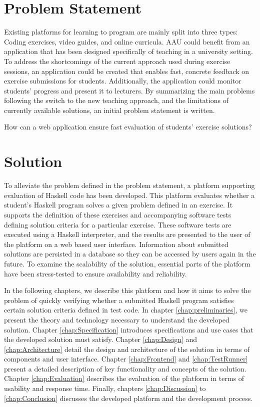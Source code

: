\section{Problem Statement}
Existing platforms for learning to program are mainly split into three types: Coding exercises, video guides, and online curricula.
AAU could benefit from an application that has been designed specifically of teaching in a university setting.
To address the shortcomings of the current approach used during exercise sessions, an application could be created that enables fast, concrete feedback on exercise submissions for students. Additionally, the application could monitor students' progress and present it to lecturers.
By summarizing the main problems following the switch to the new teaching approach, and the limitations of currently available solutions, an initial problem statement is written.
\begin{displayquote}
    How can a web application ensure fast evaluation of students' exercise solutions?
\end{displayquote}

\section{Solution}
To alleviate the problem defined in the problem statement, a platform supporting evaluation of Haskell code has been developed. This platform evaluates whether a student's Haskell program solves a given problem defined in an exercise. It supports the definition of these exercises and accompanying software tests defining solution criteria for a particular exercise. These software tests are executed using a Haskell interpreter, and the results are presented to the user of the platform on a web based user interface.
Information about submitted solutions are persisted in a database so they can be accessed by users again in the future.
To examine the scalability of the solution, essential parts of the platform have been stress-tested to ensure availability and reliability.

In the following chapters, we describe this platform and how it aims to solve the problem of quickly verifying whether a submitted Haskell program satisfies certain solution criteria defined in test code.
In chapter \ref{chap:preliminaries}, we present the theory and technology necessary to understand the developed solution.
Chapter \ref{chap:Specification} introduces specifications and use cases that the developed solution must satisfy.
Chapter \ref{chap:Design} and \ref{chap:Architecture} detail the design and architecture of the solution in terms of components and user interface.
Chapter \ref{chap:Frontend} and \ref{chap:TestRunner} present a detailed description of key functionality and concepts of the solution.
Chapter \ref{chap:Evaluation} describes the evaluation of the platform in terms of usability and response time. 
Finally, chapters \ref{chap:Discussion} to \ref{chap:Conclusion} discusses the developed platform and the development process.

